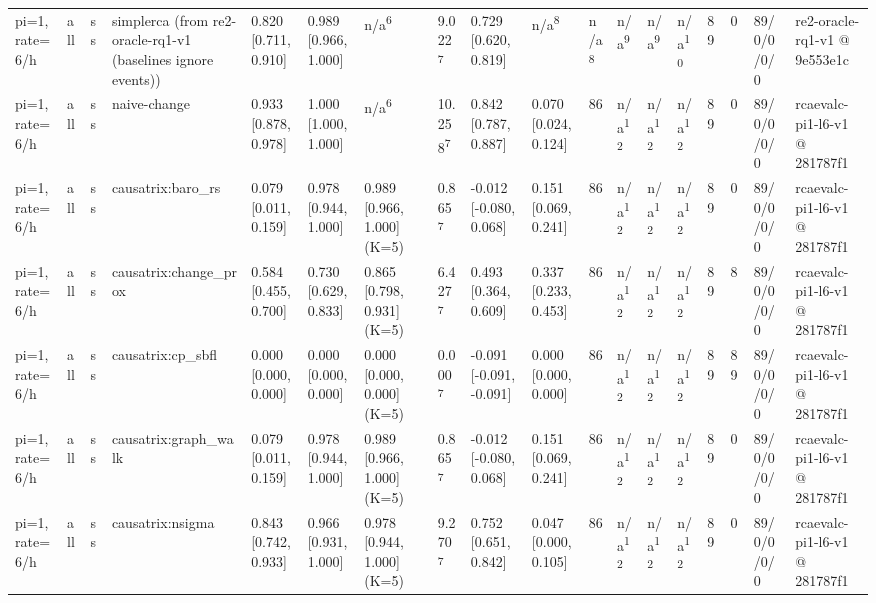 \begin{table}[t]
\begin{tabular}{llllllllllllllllll}
pi=1, rate=6/h & all & ss & simplerca (from re2-oracle-rq1-v1 (baselines ignore events)) & 0.820 [0.711, 0.910] & 0.989 [0.966, 1.000] & n/a\textsuperscript{6} & 9.022\textsuperscript{7} & 0.729 [0.620, 0.819] & n/a\textsuperscript{8} & n/a\textsuperscript{8} & n/a\textsuperscript{9} & n/a\textsuperscript{9} & n/a\textsuperscript{10} & 89 & 0 & 89/0/0/0/0 & re2-oracle-rq1-v1 @ 9e553e1c \\
pi=1, rate=6/h & all & ss & naive-change & 0.933 [0.878, 0.978] & 1.000 [1.000, 1.000] & n/a\textsuperscript{6} & 10.258\textsuperscript{7} & 0.842 [0.787, 0.887] & 0.070 [0.024, 0.124] & 86 & n/a\textsuperscript{12} & n/a\textsuperscript{12} & n/a\textsuperscript{12} & 89 & 0 & 89/0/0/0/0 & rcaevalc-pi1-l6-v1 @ 281787f1 \\
pi=1, rate=6/h & all & ss & causatrix:baro\_rs & 0.079 [0.011, 0.159] & 0.978 [0.944, 1.000] & 0.989 [0.966, 1.000] (K=5) & 0.865\textsuperscript{7} & -0.012 [-0.080, 0.068] & 0.151 [0.069, 0.241] & 86 & n/a\textsuperscript{12} & n/a\textsuperscript{12} & n/a\textsuperscript{12} & 89 & 0 & 89/0/0/0/0 & rcaevalc-pi1-l6-v1 @ 281787f1 \\
pi=1, rate=6/h & all & ss & causatrix:change\_prox & 0.584 [0.455, 0.700] & 0.730 [0.629, 0.833] & 0.865 [0.798, 0.931] (K=5) & 6.427\textsuperscript{7} & 0.493 [0.364, 0.609] & 0.337 [0.233, 0.453] & 86 & n/a\textsuperscript{12} & n/a\textsuperscript{12} & n/a\textsuperscript{12} & 89 & 8 & 89/0/0/0/0 & rcaevalc-pi1-l6-v1 @ 281787f1 \\
pi=1, rate=6/h & all & ss & causatrix:cp\_sbfl & 0.000 [0.000, 0.000] & 0.000 [0.000, 0.000] & 0.000 [0.000, 0.000] (K=5) & 0.000\textsuperscript{7} & -0.091 [-0.091, -0.091] & 0.000 [0.000, 0.000] & 86 & n/a\textsuperscript{12} & n/a\textsuperscript{12} & n/a\textsuperscript{12} & 89 & 89 & 89/0/0/0/0 & rcaevalc-pi1-l6-v1 @ 281787f1 \\
pi=1, rate=6/h & all & ss & causatrix:graph\_walk & 0.079 [0.011, 0.159] & 0.978 [0.944, 1.000] & 0.989 [0.966, 1.000] (K=5) & 0.865\textsuperscript{7} & -0.012 [-0.080, 0.068] & 0.151 [0.069, 0.241] & 86 & n/a\textsuperscript{12} & n/a\textsuperscript{12} & n/a\textsuperscript{12} & 89 & 0 & 89/0/0/0/0 & rcaevalc-pi1-l6-v1 @ 281787f1 \\
pi=1, rate=6/h & all & ss & causatrix:nsigma & 0.843 [0.742, 0.933] & 0.966 [0.931, 1.000] & 0.978 [0.944, 1.000] (K=5) & 9.270\textsuperscript{7} & 0.752 [0.651, 0.842] & 0.047 [0.000, 0.105] & 86 & n/a\textsuperscript{12} & n/a\textsuperscript{12} & n/a\textsuperscript{12} & 89 & 0 & 89/0/0/0/0 & rcaevalc-pi1-l6-v1 @ 281787f1 \\

\end{tabular}
\end{table}
